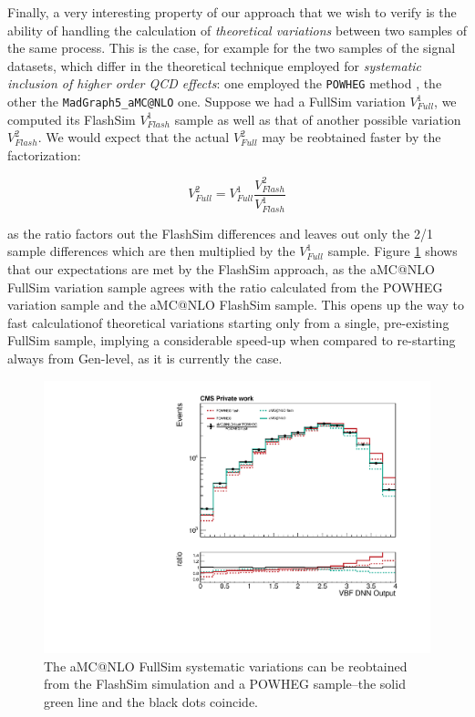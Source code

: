 Finally, a very interesting property of our approach that we wish to verify is the ability of handling the calculation of \emph{theoretical variations} between two samples of the same process. This is the case, for example for the two samples of the signal datasets, which differ in the theoretical technique employed for \emph{systematic inclusion of higher order QCD effects}: one employed the \texttt{POWHEG} method \cite{Nason_2004}, the other the \texttt{MadGraph5\_aMC@NLO} \cite{powpow} one. Suppose we had a FullSim variation $V^1_{Full}$, we computed its FlashSim $V^1_{Flash}$ sample as well as that of another possible variation $V^2_{Flash}$. We would expect that the actual $V^2_{Full}$ may be reobtained faster by the factorization:

\[V^2_{Full} = V^1_{Full} \frac{V^2_{Flash}}{V^1_{Flash}}
\]

as the ratio factors out the FlashSim differences and leaves out only the 2/1 sample differences which are then multiplied by the $V^1_{Full}$ sample. Figure \ref{fig:sysvar} shows that our expectations are met by the FlashSim approach, as the aMC@NLO FullSim variation sample agrees with the ratio calculated from the POWHEG variation sample and the aMC@NLO FlashSim sample. This opens up the way to fast calculationof theoretical variations starting only from a single, pre-existing FullSim sample, implying a considerable speed-up when compared to re-starting always from Gen-level, as it is currently the case.

\begin{figure}
    \centering
    \includegraphics[width=\linewidth]{gfx/ch6/systematic_production.pdf}
    \caption[Systematic production]{The aMC@NLO FullSim systematic variations can be reobtained from the FlashSim simulation and a POWHEG sample--the solid green line and the black dots coincide.}
    \label{fig:sysvar}
\end{figure}

